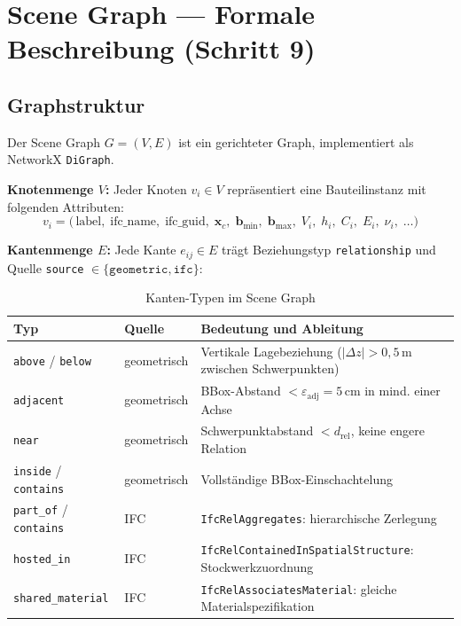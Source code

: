 \documentclass[a4paper,11pt]{article}
\begin{document}
\section{Scene Graph — Formale Beschreibung (Schritt 9)}

\subsection{Graphstruktur}

Der Scene Graph $G = (V, E)$ ist ein gerichteter Graph, implementiert als NetworkX \texttt{DiGraph}.

\textbf{Knotenmenge $V$:} Jeder Knoten $v_i \in V$ repräsentiert eine Bauteilinstanz mit folgenden Attributen:
\[
  v_i = \bigl(\,\text{label},\;\text{ifc\_name},\;\text{ifc\_guid},\;\mathbf{x}_c,\;
               \mathbf{b}_\text{min},\;\mathbf{b}_\text{max},\;V_i,\;h_i,\;C_i,\;E_i,\;\nu_i,\;\ldots\bigr)
\]

\textbf{Kantenmenge $E$:} Jede Kante $e_{ij} \in E$ trägt Beziehungstyp \texttt{relationship} und Quelle \texttt{source} $\in \{\texttt{geometric}, \texttt{ifc}\}$:

\begin{table}[H]
\centering
\caption{Kanten-Typen im Scene Graph}
\begin{tabular}{llp{7cm}}
\toprule
\textbf{Typ} & \textbf{Quelle} & \textbf{Bedeutung und Ableitung} \\
\midrule
\texttt{above} / \texttt{below} & geometrisch & Vertikale Lagebeziehung ($|\Delta z| > 0{,}5$\,m zwischen Schwerpunkten) \\
\texttt{adjacent} & geometrisch & BBox-Abstand $< \varepsilon_\text{adj} = 5$\,cm in mind. einer Achse \\
\texttt{near} & geometrisch & Schwerpunktabstand $< d_\text{rel}$, keine engere Relation \\
\texttt{inside} / \texttt{contains} & geometrisch & Vollständige BBox-Einschachtelung \\
\texttt{part\_of} / \texttt{contains} & IFC & \texttt{IfcRelAggregates}: hierarchische Zerlegung \\
\texttt{hosted\_in} & IFC & \texttt{IfcRelContainedInSpatialStructure}: Stockwerkzuordnung \\
\texttt{shared\_material} & IFC & \texttt{IfcRelAssociatesMaterial}: gleiche Materialspezifikation \\
\bottomrule
\end{tabular}
\end{table}
\end{document}
